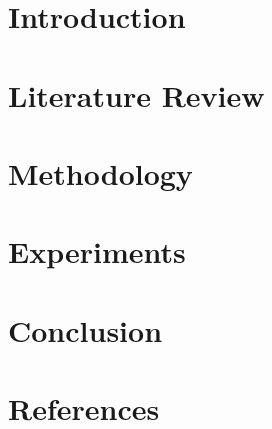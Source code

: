 \documentclass[14pt]{extreport}
\begin{document}
\begingroup\singlespacing
\tableofcontents
\endgroup
\clearpage


\chapter{Introduction}

\chapter{Literature Review}

\chapter{Methodology}

\chapter{Experiments}

\chapter{Conclusion}

\chapter{References}
\end{document}
